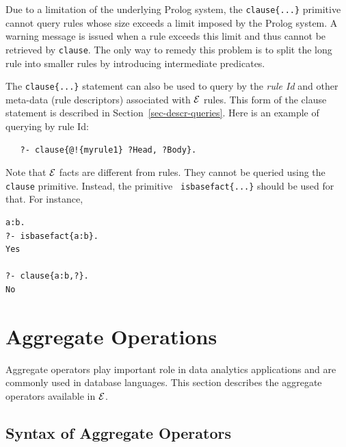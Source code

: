 \documentclass[11pt]{article}
\newcommand{\ERGO}{\mbox{\ensuremath{\cal{E}}\smaller{{\sc{RGO}}}}\xspace}
\newcommand{\FLSYSTEM}{\ERGO}
\begin{document}
Due to a limitation of the underlying Prolog system, the {\tt clause\{...\}}
primitive cannot query rules whose size exceeds a limit imposed by the
Prolog system.  A warning message is issued when a rule exceeds this limit
and thus cannot be retrieved by {\tt clause}.  The only way to remedy this
problem is to split the long rule into smaller rules by introducing
intermediate predicates.

The {\tt clause\{...\}} statement can also be used to query by the \emph{rule Id} and
other meta-data (rule descriptors)
associated with \FLSYSTEM rules. This form of the clause
statement is described in Section~\ref{sec-descr-queries}.
Here is an example of querying by rule Id:
\begin{verbatim}
   ?- clause{@!{myrule1} ?Head, ?Body}.
\end{verbatim}

Note that \FLSYSTEM facts are different from rules. They cannot be queried
using the {\tt clause} primitive. Instead, the primitive {\tt
  isbasefact\{...\}} should be used for that. For instance,
\begin{verbatim}
a:b.
?- isbasefact{a:b}.
Yes

?- clause{a:b,?}.
No
\end{verbatim}






\section{Aggregate Operations}
\label{sec-aggregates}

Aggregate operators play important role in data analytics applications and
are commonly used in database languages. This section describes the
aggregate operators available in \FLSYSTEM.

\subsection{Syntax of Aggregate Operators}
\end{document}

